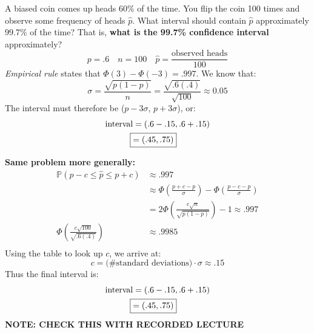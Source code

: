 \documentclass[titlepage, 12pt, leqno]{article}
\begin{document}
\begin{ex}
    A biased coin comes up heads 60\% of the time. You flip the coin 100 times and observe some frequency of heads $\hat p$. What interval should contain $\hat p$ approximately 99.7\% of the time? That is, \textbf{what is the 99.7\% confidence interval} approximately?
    \[
       p = .6 \quad n = 100 \quad \hat p = \frac{ \text{observed heads}}{100} 
    \]
   \textit{Empirical rule} states that $\Phi(3) - \Phi(-3) = .997$. We know that:
   \[
       \sigma = \frac{\sqrt{p(1-p)}}{n} = \frac{\sqrt{.6(.4)}}{\sqrt{100}} \approx 0.05
   \]
    The interval must therefore be ($p-3\sigma$, $p+3\sigma$), or:
   \begin{align*}
       \text{interval} &= (.6 - .15, .6 + .15) \\
       \Aboxed{&= (.45,.75)} 
   \end{align*}
\end{ex}
\begin{ex}
   \textbf{Same problem more generally:} 
    \begin{align*}
        \mathbb{P}(p-c \le \hat p \le p+c) &\approx .997 \\
                                           &\approx \Phi\left(\frac{p+c-p}{\sigma} \right) - \Phi\left(\frac{p-c-p}{\sigma} \right) \\
                                           &= 2\Phi\left(\frac{c\sqrt n}{\sqrt{p(1-p)}}\right) -1 \approx .997 \\
        \Phi\left(\frac{c\sqrt{100}}{\sqrt{.6(.4)}} \right) &\approx .9985 \\
    \end{align*}
    Using the table to look up $c$, we arrive at:
    \[
        c = \text{(\# standard deviations)} \cdot \sigma \approx .15 
    \]
    Thus the final interval is:
   \begin{align*}
       \text{interval} &= (.6 - .15, .6 + .15) \\
       \Aboxed{&= (.45,.75)} 
   \end{align*}
   \textbf{NOTE: CHECK THIS WITH RECORDED LECTURE}  
\end{ex}
\end{document}
